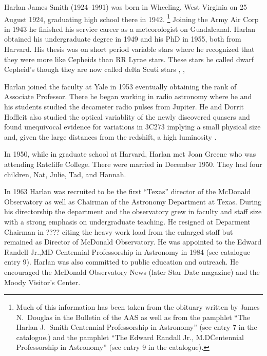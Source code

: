 
Harlan James Smith (1924--1991) was born in Wheeling, West Virginia on
25 August 1924, graduating high school there in 1942.
\footnote{Much of this information has been taken from the obituary
written by James N.~Douglas in the Bulletin of the
AAS\cite{Douglas1992Harlan} as well as from the pamphlet ``The Harlan
J.~Smith Centennial Professorship in Astronomy'' (see entry 7 in the
catalogue.) and the pamphlet ``The Edward Randall Jr.,
M.D\. Centennial Professorship in Astronomy'' (see entry 9 in the
catalogue).} Joining the Army Air Corp in 1943 he finished his service
career as a meteorologist on Guadalcanal.  Harlan obtained his
undergraduate degree in 1949 and his PhD in 1955, both from
Harvard. His thesis was on short period variable stars where he
recognized that they were more like Cepheids than RR Lyrae stars.
These stars he called dwarf Cepheid's though they are now called delta
Scuti stars \cite{HJSPhD}, \cite{HJS1955},

Harlan joined the faculty at Yale in 1953 eventually obtaining the
rank of Associate Professor. There he began working in radio astronomy
where he and his students studied the decameter radio pulses from
Jupiter. He and Dorrit Hoffleit also studied the optical variablity of
the newly discovered quasers and found unequivocal evidence for
variations in 3C273 implying a small physical size and, given the
large distances from the redshift, a high luminosity \cite{HJS1963}.

In 1950, while in graduate school at Harvard, Harlan met Joan Greene
who was attending Ratcliffe College. There were married in December
1950. They had four children, Nat, Julie, Tad, and Hannah.

In 1963 Harlan was recruited to be the first ``Texas'' director of the
McDonald Observatory as well as Chairman of the Astronomy Department
at Texas. During his directorship the department and the observatory
grew in faculty and staff size with a strong emphasis on undergraduate
teaching. He resigned at Deparment Chairman in ???? citing the heavy
work load from the enlarged staff but remained as Director of McDonald
Observatory. He was appointed to the Edward Randell Jr.,MD Centennial
Professorship in Astronomy in 1984 (see catalogue entry 9).  Harlan
was also committed to public education and outreach.  He encouraged
the McDonald Observatory News (later Star Date magazine) and the Moody
Visitor's Center.

